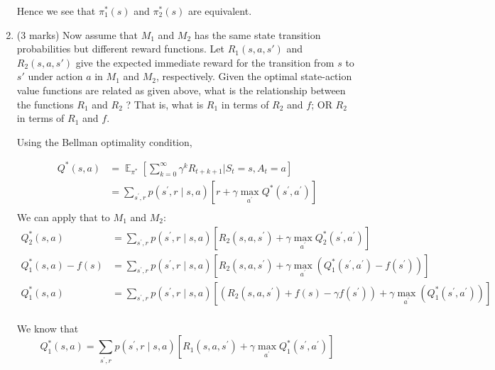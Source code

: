 \documentclass[addpoints,12pt,solution]{exam}
\DeclareMathOperator{\E}{\mathbb{E}}
\begin{document}
\begin{questions}
\begin{enumerate}[label=(\alph*)]
\begin{solution}
                Hence we see that $\pi^*_1(s)$ and $\pi^*_2(s)$ are equivalent.

            \end{solution}

            \item (3 marks) Now assume that $M_1$ and $M_2$ has the same state transition probabilities but different reward functions. Let $R_1(s, a, s')$ and $R_2(s, a, s')$ give the expected immediate reward for the transition from $s$ to $s'$ under action $a$ in $M_1$ and $M_2$, respectively. Given the optimal state-action value functions are related as given above, what is the relationship between the functions $R_1$ and $R_2$ ? That is, what is $R_1$ in terms of $R_2$ and $f$; OR $R_2$ in terms of $R_1$ and $f$.

            \begin{solution}
                Using the Bellman optimality condition,

                \begin{align*}
                    Q^*(s, a) &= \E_{\pi^*}\left[\sum_{k=0}^\infty \gamma^k R_{t+k+1} | S_t=s, A_t =a \right]\\
                    &= \sum_{s^{\prime}, r} p\left(s^{\prime}, r \mid s, a\right)\left[r+\gamma \max _{a^{\prime}} Q^*\left(s^{\prime}, a^{\prime}\right)\right]\\
                \end{align*}
                We can apply that to $M_1$ and $M_2$:
                \begin{align*}
                    Q^*_2(s, a) &=\sum_{s^{\prime}, r} p\left(s^{\prime}, r \mid s, a\right)\left[R_2(s, a, s^\prime)+\gamma \max _{a^{\prime}} Q^*_2\left(s^{\prime}, a^{\prime}\right)\right] \\
                    Q^*_1(s, a) - f(s) &=\sum_{s^{\prime}, r} p\left(s^{\prime}, r \mid s, a\right)\left[R_2(s, a, s^\prime)+\gamma \max _{a^{\prime}} (Q^*_1\left(s^{\prime}, a^{\prime}\right) - f(s^\prime))\right] \\
                    Q^*_1(s, a) &=\sum_{s^{\prime}, r} p\left(s^{\prime}, r \mid s, a\right)\left[\left(R_2(s, a, s^\prime) + f(s) - \gamma f(s^\prime)\right) +\gamma \max _{a^{\prime}} (Q^*_1\left(s^{\prime}, a^{\prime}\right))\right] \\
                \end{align*}

                We know that
                \[
                    Q^*_1(s, a) =\sum_{s^{\prime}, r} p\left(s^{\prime}, r \mid s, a\right)\left[R_1(s, a, s^\prime)+\gamma \max _{a^{\prime}} Q^*_1\left(s^{\prime}, a^{\prime}\right)\right]
                \]


\end{solution}
\end{enumerate}
\end{questions}
\end{document}
